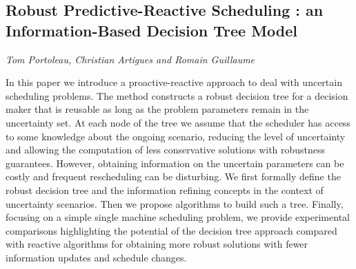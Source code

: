 \documentclass[../booklet.tex]{subfiles}
\begin{document}
\subsection[Robust Predictive-Reactive Scheduling : an Information-Based Decision Tree Model. {\it Tom Portoleau, Christian Artigues and Romain Guillaume}]{Robust Predictive-Reactive Scheduling : an Information-Based Decision Tree Model}
  

\begin{center}
  {\it Tom Portoleau, Christian Artigues and Romain Guillaume}
\end{center}



In this paper we introduce a proactive-reactive approach to deal with uncertain scheduling problems. The method constructs a robust decision tree for a decision maker  that is reusable as long as the problem parameters remain in the uncertainty set. At each node of the tree we assume that the scheduler has access to some knowledge about the ongoing scenario, reducing the level of uncertainty and allowing the computation of less conservative solutions with robustness guarantees. However, obtaining information on the uncertain parameters can be costly and frequent rescheduling can be disturbing. 
We first formally define the robust decision tree and the information refining concepts in the context of uncertainty scenarios. Then we propose algorithms to build such a tree. Finally, focusing on a simple single machine scheduling problem, we provide experimental comparisons highlighting the potential of the decision tree approach compared with reactive algorithms for obtaining more robust solutions with fewer information updates and schedule changes.
\end{document}

